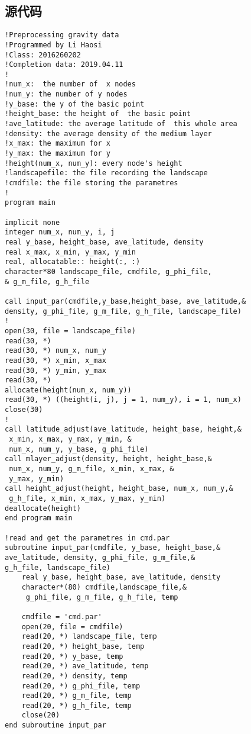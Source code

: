 \begin{appendices}
	
	\section{源代码}
	
	\begin{lstlisting}
!Preprocessing gravity data
!Programmed by Li Haosi
!Class: 2016260202
!Completion data: 2019.04.11
!
!num_x:  the number of  x nodes     
!num_y: the number of y nodes
!y_base: the y of the basic point       
!height_base: the height of  the basic point         
!ave_latitude: the average latitude of  this whole area
!density: the average density of the medium layer       
!x_max: the maximum for x        
!y_max: the maximum for y
!height(num_x, num_y): every node's height      
!landscapefile: the file recording the landscape     
!cmdfile: the file storing the parametres
!
program main

implicit none
integer num_x, num_y, i, j
real y_base, height_base, ave_latitude, density
real x_max, x_min, y_max, y_min
real, allocatable:: height(:, :)
character*80 landscape_file, cmdfile, g_phi_file,
& g_m_file, g_h_file

call input_par(cmdfile,y_base,height_base, ave_latitude,&
density, g_phi_file, g_m_file, g_h_file, landscape_file)
!
open(30, file = landscape_file)
read(30, *)
read(30, *) num_x, num_y
read(30, *) x_min, x_max
read(30, *) y_min, y_max
read(30, *)
allocate(height(num_x, num_y))
read(30, *) ((height(i, j), j = 1, num_y), i = 1, num_x)
close(30)
!
call latitude_adjust(ave_latitude, height_base, height,&
 x_min, x_max, y_max, y_min, &
 num_x, num_y, y_base, g_phi_file)
call mlayer_adjust(density, height, height_base,&
 num_x, num_y, g_m_file, x_min, x_max, &
 y_max, y_min)
call height_adjust(height, height_base, num_x, num_y,&
 g_h_file, x_min, x_max, y_max, y_min)
deallocate(height)
end program main

!read and get the parametres in cmd.par
subroutine input_par(cmdfile, y_base, height_base,&
ave_latitude, density, g_phi_file, g_m_file,&
g_h_file, landscape_file)
	real y_base, height_base, ave_latitude, density
	character*(80) cmdfile,landscape_file,&
	 g_phi_file, g_m_file, g_h_file, temp
	
	cmdfile = 'cmd.par'
	open(20, file = cmdfile)
	read(20, *) landscape_file, temp
	read(20, *) height_base, temp
	read(20, *) y_base, temp
	read(20, *) ave_latitude, temp
	read(20, *) density, temp
	read(20, *) g_phi_file, temp
	read(20, *) g_m_file, temp
	read(20, *) g_h_file, temp
	close(20)
end subroutine input_par
		

\end{lstlisting}
\end{appendices}
